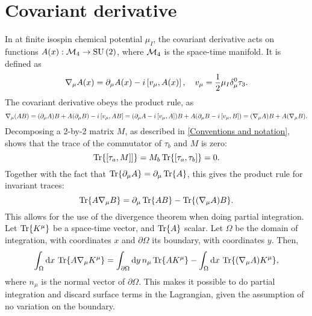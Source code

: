 \section{Covariant derivative}

\label{Covarinat derivative}
In \chpt at finite isospin chemical potential $\mu_I$, the covariant derivative acts on functions $A(x): \mathcal{M}_4 \rightarrow \mathrm{SU}\left(2\right)$, where $\mathcal{M}_4$ is the space-time manifold. It is defined as 
\begin{equation}
    \nabla_\mu A(x) = \partial_\mu A(x) - i \left[v_\mu, A(x) \right], 
    \quad v_\mu = \frac{1}{2} \mu_I \delta_\mu^0 \tau_3.
\end{equation}
The covariant derivative obeys the product rule, as
\begin{equation*}
    \nabla_\mu (A B) 
    = (\partial_\mu A) B + A (\partial_\mu B) - i \left[v_\mu, AB \right]
    = (\partial_\mu A - i \left[v_\mu, A \right])B + A(\partial_\mu B- i \left[v_\mu, B \right]) 
    = (\nabla_\mu A)B + A (\nabla_\mu B).
\end{equation*}
Decomposing a 2-by-2 matrix $M$, as described in \autoref{Conventions and notation}, shows that the trace of the commutator of $\tau_b$ and $M$ is zero:
\begin{equation*}
    \Tr{\left[\tau_a, M \right]]} = M_b\Tr{ \left[\tau_a, \tau_b \right]} = 0.
\end{equation*}
Together with the fact that $\Tr{\partial_\mu A} = \partial_\mu \Tr{A}$, this gives the product rule for invariant traces:
\begin{equation*}
    \Tr{A \nabla_\mu B} = \partial_\mu \Tr{AB} - \Tr{(\nabla_\mu A) B}.
\end{equation*}
This allows for the use of the divergence theorem when doing partial integration.
Let $\Tr{K^\mu}$ be a space-time vector, and $\Tr{A}$ scalar. 
Let $\Omega$ be the domain of integration, with coordinates $x$ and $\partial \Omega$ its boundary, with coordinates $y$. Then, 
\begin{align*}
    \int_\Omega \dd x \, \Tr{A \nabla_\mu K^\mu} = \int_{\partial\Omega} \dd y\, n_\mu \Tr{A K^\mu} - \int_\Omega \dd x \, \Tr{(\nabla_\mu A) K^\mu},
\end{align*}
where $n_\mu$ is the normal vector of $\partial \Omega$.\cite{Carroll:spacetime}
This makes it possible to do partial integration and discard surface terms in the \chpt Lagrangian, given the assumption of no variation on the boundary.
